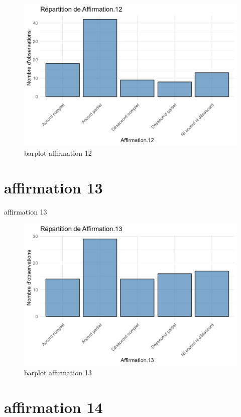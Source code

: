 \documentclass[
]{article}
\begin{document}
\begin{figure}
\centering
\includegraphics{Image/barplot_Affirmation.12.png}
\caption{barplot affirmation 12}
\end{figure}

\section{affirmation 13}\label{affirmation-13}

affirmation 13

\begin{figure}
\centering
\includegraphics{Image/barplot_Affirmation.13.png}
\caption{barplot affirmation 13}
\end{figure}

\section{affirmation 14}\label{affirmation-14}
\end{document}
